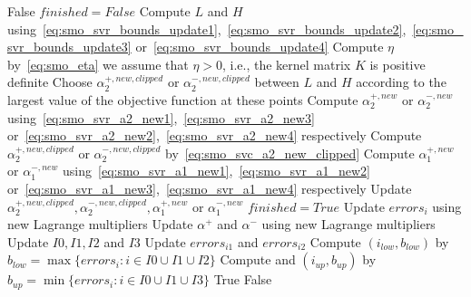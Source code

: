 \begin{breakablealgorithm}
	\newpage
	
	\begin{algorithmic}
				\State \Return False
			\EndIf
			\State $finished = False$
				\State Compute $L$ and $H$ using~\eqref{eq:smo_svr_bounds_update1},~\eqref{eq:smo_svr_bounds_update2},~\eqref{eq:smo_svr_bounds_update3} or~\eqref{eq:smo_svr_bounds_update4}
					\State Compute $\eta$ by~\eqref{eq:smo_eta} \Comment we assume that $\eta > 0$, i.e., the kernel matrix $K$ is positive definite
						\State Choose $\alpha_2^{+,new,clipped}$ or $\alpha_2^{-,new,clipped}$ between $L$ and $H$ according to the largest value of the objective function at these points
					\Else
						\State Compute $\alpha_2^{+,new}$ or $\alpha_2^{-,new}$ using~\eqref{eq:smo_svr_a2_new1},~\eqref{eq:smo_svr_a2_new3} or~\eqref{eq:smo_svr_a2_new2},~\eqref{eq:smo_svr_a2_new4} respectively
						\State Compute $\alpha_2^{+,new,clipped}$ or $\alpha_2^{-,new,clipped}$ by~\eqref{eq:smo_svc_a2_new_clipped}
					\EndIf
					\State Compute $\alpha_1^{+,new}$ or $\alpha_1^{-,new}$ using~\eqref{eq:smo_svr_a1_new1},~\eqref{eq:smo_svr_a1_new2} or~\eqref{eq:smo_svr_a1_new3},~\eqref{eq:smo_svr_a1_new4} respectively
						\State Update $\alpha_2^{+,new,clipped}, \alpha_2^{-,new,clipped}, \alpha_1^{+,new}$ or $\alpha_1^{-,new}$
					\EndIf
				\Else
					\State $finished = True$
				\EndIf
			\EndWhile
					\State Update $errors_i$ using new Lagrange multipliers
				\EndFor
				\State Update $\alpha^+$ and $\alpha^-$ using new Lagrange multipliers
				\State Update $I0, I1, I2$ and $I3$
				\State Update $errors_{i1}$ and $errors_{i2}$
					\State Compute $(i_{low}, b_{low})$ by $b_{low} = \max\{errors_i : i \in I0 \cup I1 \cup I2\}$
					\State Compute and $(i_{up}, b_{up})$ by $b_{up} = \min\{errors_i : i \in I0 \cup I1 \cup I3\}$
				\EndFor
				\State \Return True
			\Else
				\State \Return False
			\EndIf
		\EndFunction
	\end{algorithmic}
\end{breakablealgorithm}